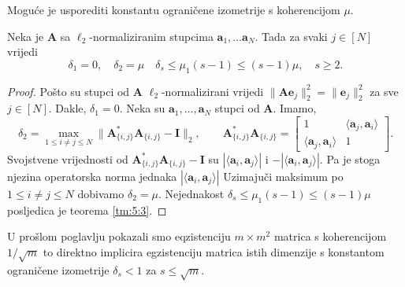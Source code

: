 \documentclass[a4paper,twoside,12pt]{memoir} %
\newcommand{\vect}[1]{\mathbf{#1}}
\renewcommand{\vec}{\vect}
\newcommand{\norm}[1]{\|{#1}\|}
\begin{document}
Mogu\'ce je usporediti konstantu ograni\v{c}ene izometrije s koherencijom $\mu$.
\begin{prop}\label{prop:6:2}
    Neka je $\vec A$ sa $\ell_2$-normaliziranim stupcima $\vec a_1, \dots \vec a_N$. Tada za svaki $j \in [N]$ vrijedi
    \begin{equation*}
        \delta_1 = 0, \quad \delta_2 = \mu \quad \delta_s \leq \mu_1(s-1) \leq (s-1)\mu, \quad s \geq 2. 
    \end{equation*}
\end{prop}
\begin{proof}
    Po\v{s}to su stupci od $\vec A$ $\ell_2$-normalizirani vrijedi $\norm{\vec{Ae}_j}_2^2 = \norm{\vec e_j}_2^2$ za sve $j \in [N]$. Dakle, $\delta_1 = 0$. Neka su $\vec a_1, \dots, \vec a_N$ stupci od $\vec A$. Imamo,
    \begin{equation}
        \delta_2 = \max_{1 \leq i \neq j \leq N} \norm{\vec A^*_{\{i,j\}}\vec A_{\{i,j\}} - \vec I}_2, \quad \quad \vec A^*_{\{i,j\}}\vec A_{\{i,j\}} = 
        \begin{bmatrix*}
            1 & \langle \vec a_j, \vec a_i \rangle \\
            \langle \vec a_j, \vec a_i \rangle  & 1
        \end{bmatrix*}.
    \end{equation}
    Svojstvene vrijednosti od $\vec A^*_{\{i,j\}}\vec A_{\{i,j\}} - \vec I$ su $|\langle \vec a_i, \vec a_j \rangle |$ i $-|\langle \vec a_i, \vec a_j \rangle |$. Pa je stoga njezina operatorska norma jednaka $|\langle \vec a_i, \vec a_j \rangle |$ Uzimaju\v{c}i maksimum po $1 \leq i \neq j \leq N$ dobivamo $\delta_2 = \mu$. Nejednakost $\delta_s \leq \mu_1(s-1) \leq (s-1)\mu$ posljedica je teorema \ref{tm:5:3}.
\end{proof}

U pro\v{s}lom poglavlju pokazali smo eqzistenciju $m \times m^2$ matrica s koherencijom $1/\sqrt{m}$ to direktno implicira egzistenciju matrica istih dimenzije s konstantom ograni\v{c}ene izometrije $\delta_s < 1$ za $s \leq \sqrt{m}$.
\end{document}
